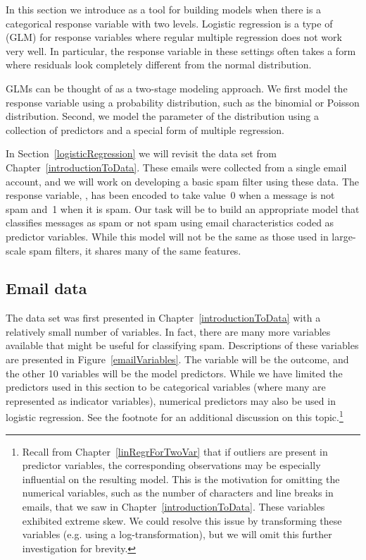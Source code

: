 
In this section we introduce  as a tool for building models when there is a categorical response variable with two levels. Logistic regression is a type of  (GLM) for response variables where regular multiple regression does not work very well. In particular, the response variable in these settings often takes a form where residuals look completely different from the normal distribution.

GLMs can be thought of as a two-stage modeling approach. We first model the response variable using a probability distribution, such as the binomial or Poisson distribution. Second, we model the parameter of the distribution using a collection of predictors and a special form of multiple regression.


In Section~\ref{logisticRegression} we will revisit the  data set from Chapter~\ref{introductionToData}. These emails were collected from a single email account, and we will work on developing a basic spam filter using these data. The response variable, , has been encoded to take value~0 when a message is not spam and~1 when it is spam. Our task will be to build an appropriate model that classifies messages as spam or not spam using email characteristics coded as predictor variables. While this model will not be the same as those used in large-scale spam filters, it shares many of the same features. 

\subsection{Email data}

The  data set was first presented in Chapter~\ref{introductionToData} with a relatively small number of variables. In fact, there are many more variables available that might be useful for classifying spam. Descriptions of these variables are presented in Figure~\ref{emailVariables}. The  variable will be the outcome, and the other 10 variables will be the model predictors. While we have limited the predictors used in this section to be categorical variables (where many are represented as indicator variables), numerical predictors may also be used in logistic regression. See the footnote for an additional discussion on this topic.\footnote{Recall from Chapter~\ref{linRegrForTwoVar} that if outliers are present in predictor variables, the corresponding observations may be especially influential on the resulting model. This is the motivation for omitting the numerical variables, such as the number of characters and line breaks in emails, that we saw in Chapter~\ref{introductionToData}. These variables exhibited extreme skew. We could resolve this issue by transforming these variables (e.g. using a log-transformation), but we will omit this further investigation for brevity.}

